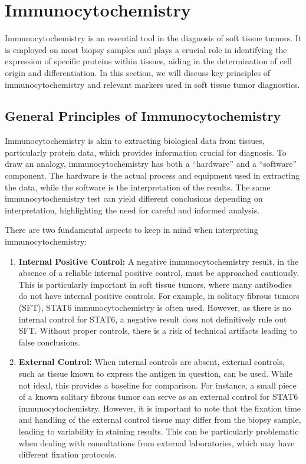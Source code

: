 \section{Immunocytochemistry}

Immunocytochemistry is an essential tool in the diagnosis of soft tissue tumors. It is employed on most biopsy samples and plays a crucial role in identifying the expression of specific proteins within tissues, aiding in the determination of cell origin and differentiation. In this section, we will discuss key principles of immunocytochemistry and relevant markers used in soft tissue tumor diagnostics.

\subsection{General Principles of Immunocytochemistry}
Immunocytochemistry is akin to extracting biological data from tissues, particularly protein data, which provides information crucial for diagnosis. To draw an analogy, immunocytochemistry has both a “hardware” and a “software” component. The hardware is the actual process and equipment used in extracting the data, while the software is the interpretation of the results. The same immunocytochemistry test can yield different conclusions depending on interpretation, highlighting the need for careful and informed analysis.

There are two fundamental aspects to keep in mind when interpreting immunocytochemistry:

\begin{enumerate}
    \item \textbf{Internal Positive Control:} A negative immunocytochemistry result, in the absence of a reliable internal positive control, must be approached cautiously. This is particularly important in soft tissue tumors, where many antibodies do not have internal positive controls. For example, in solitary fibrous tumors (SFT), STAT6 immunocytochemistry is often used. However, as there is no internal control for STAT6, a negative result does not definitively rule out SFT. Without proper controls, there is a risk of technical artifacts leading to false conclusions.
    
    \item \textbf{External Control:} When internal controls are absent, external controls, such as tissue known to express the antigen in question, can be used. While not ideal, this provides a baseline for comparison. For instance, a small piece of a known solitary fibrous tumor can serve as an external control for STAT6 immunocytochemistry. However, it is important to note that the fixation time and handling of the external control tissue may differ from the biopsy sample, leading to variability in staining results. This can be particularly problematic when dealing with consultations from external laboratories, which may have different fixation protocols.
\end{enumerate}

